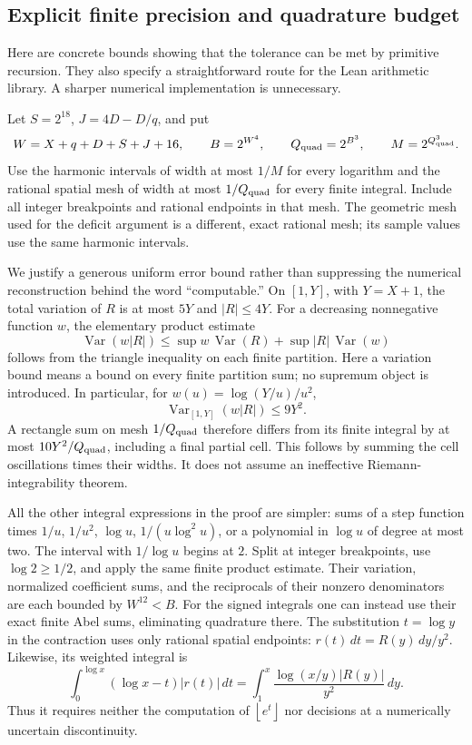 \documentclass[11pt]{article}
\theoremstyle{definition}
\theoremstyle{remark}
\newcommand{\floor}[1]{\left\lfloor#1\right\rfloor}
\begin{document}
\subsection{Explicit finite precision and quadrature budget}\label{sec:budget}

Here are concrete bounds showing that the tolerance can be met by primitive
recursion. They also specify a straightforward route for the Lean arithmetic
library. A sharper numerical implementation is unnecessary.

Let $S=2^{18}$, $J=4D-D/q$, and put
\begin{equation}\label{eq:precision}
 W=X+q+D+S+J+16,\qquad B=2^{W^4},\qquad
 Q_{\rm quad}=2^{B^3},\qquad M=2^{Q_{\rm quad}^3}.
\end{equation}
Use the harmonic intervals of width at most $1/M$ for every logarithm and
the rational spatial mesh of width at most $1/Q_{\rm quad}$ for every finite integral.
Include all integer breakpoints and rational endpoints in that mesh. The
geometric mesh used for the deficit argument is a different, exact rational
mesh; its sample values use the same harmonic intervals.

We justify a generous uniform error bound rather than suppressing the
numerical reconstruction behind the word ``computable.'' On $[1,Y]$, with
$Y=X+1$, the total variation of $R$ is at most $5Y$ and $|R|\le4Y$.
For a decreasing nonnegative function $w$, the elementary product estimate
\[
 \operatorname{Var}(w|R|)
 \le \sup w\,\operatorname{Var}(R)
       +\sup|R|\,\operatorname{Var}(w)
\]
follows from the triangle inequality on each finite partition. Here a
variation bound means a bound on every finite partition sum; no supremum
object is introduced. In particular,
for $w(u)=\log(Y/u)/u^2$,
\begin{equation}\label{eq:var}
 \operatorname{Var}_{[1,Y]}(w|R|)\le9Y^2.
\end{equation}
A rectangle sum on mesh $1/Q_{\rm quad}$ therefore differs from its finite integral
by at most $10Y^2/Q_{\rm quad}$, including a final partial cell. This follows by summing
the cell oscillations times their widths. It does not assume an ineffective
Riemann-integrability theorem.

All the other integral expressions in the proof are simpler: sums of a
step function times $1/u$, $1/u^2$, $\log u$, $1/(u\log^2u)$, or a
polynomial in $\log u$ of degree at most two. The interval with
$1/\log u$ begins at $2$. Split at integer breakpoints, use
$\log2\ge1/2$, and apply the same finite product estimate. Their variation,
normalized coefficient sums, and the reciprocals of their nonzero
denominators are each bounded by $W^{12}<B$. For the signed integrals one
can instead use their exact finite Abel sums, eliminating quadrature there.
The substitution $t=\log y$ in the contraction uses only rational spatial
endpoints: $r(t)\,dt=R(y)\,dy/y^2$. Likewise, its weighted integral is
\[
 \int_0^{\log x}(\log x-t)|r(t)|\,dt
 =\int_1^x\frac{\log(x/y)|R(y)|}{y^2}\,dy.
\]
Thus it requires neither the computation of $\floor{e^t}$ nor decisions
at a numerically uncertain discontinuity.
\end{document}
